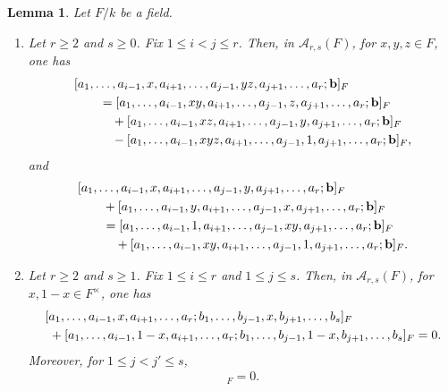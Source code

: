\documentclass[a4paper,12pt,reqno]{amsart}
\numberwithin{equation}{section}
\newtheorem{lem}[lem]{Lemma}
\theoremstyle{definition}
\newcommand{\blue}{\color{blue}}
\newcommand{\black}{\color{black}}
\newcommand{\Acal}{\mathcal{A}}
\newcommand{\va}{\mathbf{a}}
\newcommand{\vb}{\mathbf{b}}
\begin{document}
\begin{lem}\label{lem:tworel}
Let $F/k$ be a field.
\begin{enumerate}
    \item 
    Let $r\geq2$ and $s\ge 0$.  Fix
$1\leq i<j\leq r$.
Then, in $\Acal_{r,s}(F)$, for $x,y,z\in F$, one has
\begin{align}
 &[a_1,\ldots,a_{i-1},x,a_{i+1},\ldots,
   a_{j-1},yz,a_{j+1},\ldots,a_r;\vb]_F
 \notag\\
 &\qquad=
 [a_1,\ldots,a_{i-1},xy,a_{i+1},\ldots,
   a_{j-1},z,a_{j+1},\ldots,a_r;\vb]_F
 \notag\\
 &\qquad\quad+
 [a_1,\ldots,a_{i-1},xz,a_{i+1},\ldots,
   a_{j-1},y,a_{j+1},\ldots,a_r;\vb]_F
 \notag\\
 &\qquad\quad-
 [a_1,\ldots,a_{i-1},xyz,a_{i+1},\ldots,
   a_{j-1},1,a_{j+1},\ldots,a_r;\vb]_F,
 \label{eq:leib}
\end{align}
and
\begin{align}
 &[a_1,\ldots,a_{i-1},x,a_{i+1},\ldots,
   a_{j-1},y,a_{j+1},\ldots,a_r;\vb]_F
 \notag\\
 &\qquad+
 [a_1,\ldots,a_{i-1},y,a_{i+1},\ldots,
   a_{j-1},x,a_{j+1},\ldots,a_r;\vb]_F
 \notag\\
 &\qquad=
 [a_1,\ldots,a_{i-1},1,a_{i+1},\ldots,
   a_{j-1},xy,a_{j+1},\ldots,a_r;\vb]_F
 \notag\\
 &\qquad\quad+
 [a_1,\ldots,a_{i-1},xy,a_{i+1},\ldots,
   a_{j-1},1,a_{j+1},\ldots,a_r;\vb]_F.
 \label{eq:sym}
\end{align}
\item 
Let $r\geq2$ and $s\ge 1$.  Fix
$1\leq i\leq r$ and $1\leq j\leq s$. %
Then, in $\Acal_{r,s}(F)$, for $x,1-x\in F^\times$, one has
\begin{align}
    &[a_1,\ldots,a_{i-1},x,a_{i+1},\ldots,a_r;b_1,\dots,b_{j-1},x,b_{j+1},\dots,b_s]_F 
 \notag\\
 &\ +
 [a_1,\ldots,a_{i-1},1-x,a_{i+1},\ldots,a_r;b_1,\dots,b_{j-1},1-x,b_{j+1},\dots,b_s]_F
 =0.
 \label{eq:diff}
\end{align}
Moreover, for $1\leq j<j'\leq s$,
\begin{align}
 [\va;b_1,\dots,b_{j-1},x,b_{j+1},\dots,b_{j'-1},x,b_{j'+1},\dots,b_s]_F
 =0.
 \label{eq:diff2}
\end{align}
\end{enumerate}
\end{lem}
\end{document}
